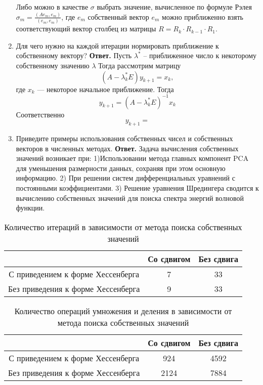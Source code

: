 \documentclass{article}
\begin{document}
\begin{enumerate}
    
	Либо можно в качестве $\sigma$ выбрать значение, вычисленное по формуле Рэлея $\sigma_m = \frac{(Ae_m,e_m)}{(e_m,e_m)}$, где $e_m$ собственный вектор $e_m$ можно приближенно взять соответствующий вектор столбец из матрицы $R=R_k \cdot R_{k-1} \cdot R_1$. 
        \item Для чего нужно на каждой итерации нормировать приближение к собственному вектору?
        \newline
        {\bfseries Ответ. } 
        Пусть $\lambda^{*}$ -- приближенное число к некоторому собственному значению $\lambda$
        Тогда рассмотрим матрицу 
        \begin{equation*}
            (A - \lambda^{*}_k E) y_{k+1} = x_k,
        \end{equation*}
        где $x_k$ --- некоторое начальное приближение.
        Тогда 
        \begin{equation*}
            y_{k+1} = (A - \lambda^{*}_k E)^{-1} x_k
        \end{equation*}
        Соответственно
        \begin{equation*}
            y_{k+1} = 
        \end{equation*}
        \item Приведите примеры использования собственных чисел
        и собственных векторов в численных методах.
        \newline
        {\bfseries Ответ. } 
        Задача вычисления собственных значений возникает при: 1)Использовании метода главных компонент PCA для уменьшения размерности данных, сохраняя при этом основную информацию. 2) При решении систем дифференциальных уравнений с постоянными коэффициентами. 3) Решение уравнения Шредингера сводится к вычислению собственных значений для поиска спектра энергий волновой функции.
    \end{enumerate}  

\newpage
    \begin{table}[h!]
        \centering
        \caption{Количество итераций в зависимости от метода поиска собственных значений}
        \begin{tabular}{|c|c|c|}
        \hline
        & Со сдвигом & Без сдвига\\
        \hline 
        С приведением к форме Хессенберга &7 &33 \\ 
        \hline 
        Без приведения к форме Хессенберга & 9 &33 \\
        \hline
        \end{tabular}
    \end{table}
    \begin{table}[h!]
        \centering
        \caption{Количество операций умножения и деления в зависимости от метода поиска собственных значений}
        \begin{tabular}{|c|c|c|}
        \hline
        & Со сдвигом & Без сдвига\\
        \hline 
        С приведением к форме Хессенберга & 924 & 4592 \\ 
        \hline 
        Без приведения к форме Хессенберга & 2124 & 7884 \\
        \hline
        \end{tabular}
    \end{table}
    
\end{document}
